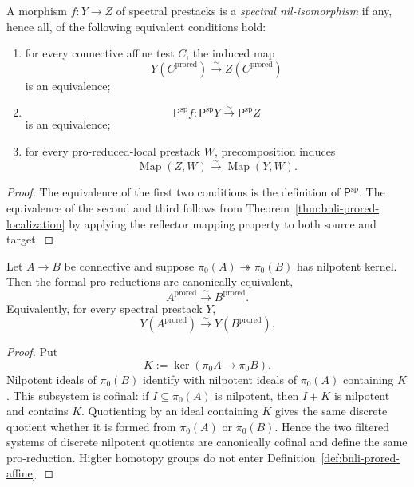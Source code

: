 \begin{definition}
\label{def:bnli-nil-isomorphism}
A morphism $f:Y\to Z$ of spectral prestacks is a \emph{spectral
nil-isomorphism} if any, hence all, of the following equivalent conditions
hold:
\begin{enumerate}
    \item for every connective affine test $C$, the induced map
    \[
        Y(C^{\mathrm{prored}})
        \xrightarrow{\sim}
        Z(C^{\mathrm{prored}})
    \]
    is an equivalence;
    \item
    \[
        \mathsf P^{\mathrm{sp}}f:
        \mathsf P^{\mathrm{sp}}Y
        \xrightarrow{\sim}
        \mathsf P^{\mathrm{sp}}Z
    \]
    is an equivalence;
    \item for every pro-reduced-local prestack $W$, precomposition induces
    \[
        \operatorname{Map}(Z,W)
        \xrightarrow{\sim}
        \operatorname{Map}(Y,W).
    \]
\end{enumerate}
\end{definition}

\begin{proof}
The equivalence of the first two conditions is the definition of
$\mathsf P^{\mathrm{sp}}$.  The equivalence of the second and third follows
from Theorem~\ref{thm:bnli-prored-localization} by applying the reflector
mapping property to both source and target.
\end{proof}

\begin{lemma}
\label{lem:bnli-prored-thickening}
Let $A\to B$ be connective and suppose
$\pi_0(A)\twoheadrightarrow\pi_0(B)$ has nilpotent kernel.  Then the formal
pro-reductions are canonically equivalent,
\[
    A^{\mathrm{prored}}
    \xrightarrow{\sim}
    B^{\mathrm{prored}}.
\]
Equivalently, for every spectral prestack $Y$,
\[
    Y(A^{\mathrm{prored}})
    \xrightarrow{\sim}
    Y(B^{\mathrm{prored}}).
\]
\end{lemma}

\begin{proof}
Put
\[
    K:=\ker(\pi_0A\to\pi_0B).
\]
Nilpotent ideals of $\pi_0(B)$ identify with nilpotent ideals of $\pi_0(A)$
containing $K$.  This subsystem is cofinal: if $I\subseteq\pi_0(A)$ is
nilpotent, then $I+K$ is nilpotent and contains $K$.  Quotienting by an ideal
containing $K$ gives the same discrete quotient whether it is formed from
$\pi_0(A)$ or $\pi_0(B)$.  Hence the two filtered systems of discrete
nilpotent quotients are canonically cofinal and define the same pro-reduction.
Higher homotopy groups do not enter Definition~\ref{def:bnli-prored-affine}.
\end{proof}

